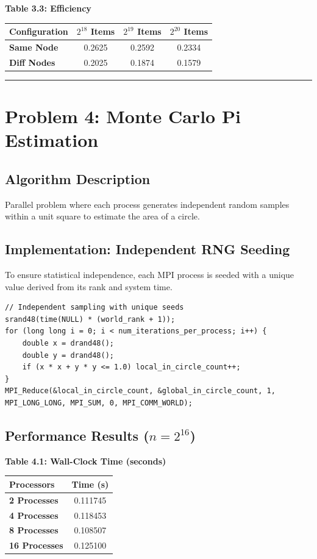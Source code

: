 \documentclass[11pt]{article}
\begin{document}
\begin{center}
\textbf{Table 3.3: Efficiency} \\
\begin{tabular}{@{}lccc@{}}
\toprule
Configuration & $2^{18}$ Items & $2^{19}$ Items & $2^{20}$ Items \\
\midrule
\textbf{Same Node} & 0.2625 & 0.2592 & 0.2334 \\
\textbf{Diff Nodes} & 0.2025 & 0.1874 & 0.1579 \\
\bottomrule
\end{tabular}
\end{center}

\noindent\rule{\textwidth}{0.4pt}

\section*{Problem 4: Monte Carlo Pi Estimation}

\subsection*{Algorithm Description}
Parallel problem where each process generates independent random samples within a unit square to estimate the area of a circle. 

\subsection*{Implementation: Independent RNG Seeding}
To ensure statistical independence, each MPI process is seeded with a unique value derived from its rank and system time.

\begin{lstlisting}
// Independent sampling with unique seeds
srand48(time(NULL) * (world_rank + 1));
for (long long i = 0; i < num_iterations_per_process; i++) {
    double x = drand48();
    double y = drand48();
    if (x * x + y * y <= 1.0) local_in_circle_count++;
}
MPI_Reduce(&local_in_circle_count, &global_in_circle_count, 1, MPI_LONG_LONG, MPI_SUM, 0, MPI_COMM_WORLD);
\end{lstlisting}

\subsection*{Performance Results ($n = 2^{16}$)}

\begin{center}
\textbf{Table 4.1: Wall-Clock Time (seconds)} \\
\begin{tabular}{@{}lc@{}}
\toprule
Processors & Time (s) \\
\midrule
\textbf{2 Processes} & 0.111745 \\
\textbf{4 Processes} & 0.118453 \\
\textbf{8 Processes} & 0.108507 \\
\textbf{16 Processes} & 0.125100 \\
\bottomrule
\end{tabular}
\end{center}
\end{document}
